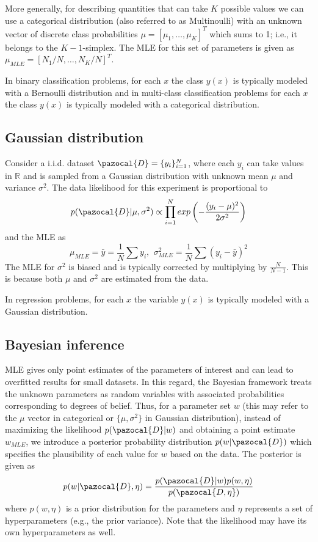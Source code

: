 More generally, for describing quantities that can take $K$ possible values we can use a categorical distribution (also referred to as Multinoulli) with an unknown vector of discrete class probabilities $\mu = [\mu_1,\dots, \mu_K]^T$ which sums to 1; i.e., it belongs to the $K-1$-simplex.
The MLE for this set of parameters is given as $\mu_{MLE} = [N_1/N,\dots, N_K/N]^T$. 

In binary classification problems, for each $x$ the class $y(x)$ is typically modeled with a Bernoulli distribution and in multi-class classification problems for each $x$ the class $y(x)$ is typically modeled with a categorical distribution.

\subsection{Gaussian distribution}
Consider a i.i.d. dataset $\pazocal{D} = \{y_i\}_{i=1}^{N}$, where each $y_i$ can take values in $\mathbb{R}$ and is sampled from a Gaussian distribution with unknown mean $\mu$ and variance $\sigma^2$. 
The data likelihood for this experiment is proportional to
\begin{equation}
	p(\pazocal{D}|\mu, \sigma^2) \propto \prod_{i=1}^{N} exp\left(-\frac{(y_i-\mu)^2}{2\sigma^2}\right)
\end{equation}
and the MLE as 
\begin{equation}
	\mu_{MLE} = \bar{y} = \frac{1}{N}\sum{y_i} \text{, } \ 
	\sigma^2_{MLE} = \frac{1}{N}\sum{(y_i - \bar{y})^2}
\end{equation}
The MLE for $\sigma^2$ is biased and is typically corrected by multiplying by $\frac{N}{N-1}$. 
This is because both $\mu$ and $\sigma^2$ are estimated from the data.

In regression problems, for each $x$ the variable $y(x)$ is typically modeled with a Gaussian distribution.

\subsection{Bayesian inference}
MLE gives only point estimates of the parameters of interest and can lead to overfitted results for small datasets. 
In this regard, the Bayesian framework treats the unknown parameters as random variables with associated probabilities corresponding to degrees of belief. 
Thus, for a parameter set $w$ (this may refer to the $\mu$ vector in categorical or $\{\mu, \sigma^2\}$ in Gaussian distribution), instead of maximizing the likelihood $p(\pazocal{D}|w)$ and obtaining a point estimate $w_{MLE}$, we introduce a posterior probability distribution $p(w|\pazocal{D})$ which specifies the plausibility of each value for $w$ based on the data. 
The posterior is given as
\begin{equation}\label{eq:posterior}
	p(w|\pazocal{D}, \eta) = \frac{p(\pazocal{D}|w)p(w, \eta)}{p(\pazocal{D, \eta})}
\end{equation}
where $p(w, \eta)$ is a prior distribution for the parameters and $\eta$ represents a set of hyperparameters (e.g., the prior variance).
Note that the likelihood may have its own hyperparameters as well.

